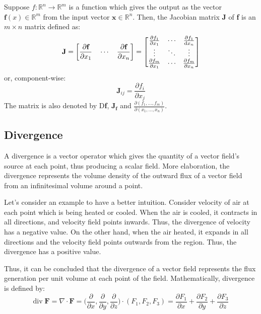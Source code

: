 Suppose $ f:\mathbb{R}^{n} \rightarrow \mathbb{R}^{m}$ is a function which gives the output as the vector $ \textbf{f}(x)\in \mathbb{R}^{m} $ from the input vector $ \textbf{x} \in \mathbb{R}^{n} $. Then, the Jacobian matrix \textbf{J} of \textbf{f} is an $ m \times n $ matrix defined as:
\begin{equation}
	\textbf{J} = \bigg[ \frac{\partial \textbf{f}}{\partial x_{1}} \quad \cdots \quad \frac{\partial \textbf{f}}{\partial x_{n}}  \bigg] = 
	\begin{bmatrix}
	\frac{\partial f_{1}}{\partial x_{1}} & \cdots & \frac{\partial f_{1}}{\mathop{}\!\mathrm{d} x_{n}} \\
	\vdots & \ddots &  \vdots \\
	\frac{\partial f_{m}}{\partial x_{1}} & \cdots &  \frac{\partial f_{m}}{\partial x_{n}}
	\end{bmatrix}
\end{equation}
 or, component-wise:
\begin{equation}
	\textbf{J}_{ij} = \frac{\partial f_{i}}{\partial x_{j}}
\end{equation}
The matrix is also denoted by D\textbf{f}, $\textbf{J}_{\textbf{f}} $ and $ \frac{\partial (f_{1}, \ldots, f_{m})}{\partial (x_{1}, \ldots, x_{n})} $.

\subsection{Divergence}
A divergence is a vector operator which gives the quantity of a vector field's source at each point, thus producing a scalar field. More elaboration, the divergence represents the volume density of the outward flux of a vector field from an infinitesimal volume around a point. 

Let's consider an example to have a better intuition. Consider velocity of air at each point which is being heated or cooled. When the air is cooled, it contracts in all directions, and velocity field points inwards. Thus, the divergence of velocity has a negative value. On the other hand, when the air heated, it expands in all directions and the velocity field points outwards from the region. Thus, the divergence has a positive value.

Thus, it can be concluded that the divergence of a vector field represents the flux generation per unit volume at each point of the field. Mathematically, divergence is defined by:
\begin{equation}
\text{div} \; \textbf{F} = \nabla \cdot \textbf{F} = \bigg( \frac{\partial}{\partial x}, \frac{\partial}{\partial y}, \frac{\partial}{\partial z} \bigg) \cdot (F_{1}, F_{2}, F_{3}) = \frac{\partial F_{1}}{\partial x} + \frac{\partial F_{2}}{\partial y} + \frac{\partial F_{3}}{\partial z}
\end{equation} 

